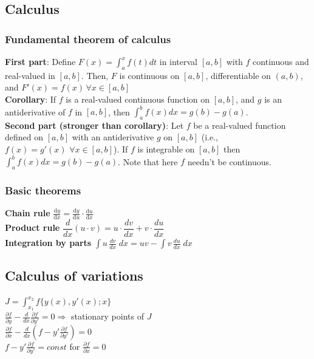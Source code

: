 \documentclass[letterpaper,landscape,10pt]{article}
\begin{document}
{\begin{multicols}{4}
	\subsection*{Calculus}
	\subsubsection*{Fundamental theorem of calculus}
		\textbf{First part}: Define $F(x) = \int_a^x f(t) dt$ in interval
		$[a,b]$ with $f$ continuous and real-valued in $[a,b]$.  Then, $F$ is
		continuous on $[a,b]$, differentiable on $(a,b)$, and $F'(x) = f(x) \,
		\forall x \in [a,b]$\\
		\vspace{4pt}
		\textbf{Corollary}: If $f$ is a real-valued continuous function on
		$[a,b]$, and $g$ is an antiderivative of $f$ in $[a,b]$, then $\int_a^b
		f(x)dx = g(b)-g(a)$.\\
		\vspace{4pt}
		\textbf{Second part (stronger than corollary)}: Let $f$ be a real-valued
		function defined on $[a,b]$ with an antiderivative $g$ on $[a,b]$
		(i.e., $f(x)=g'(x) \,\, \forall x \in [a,b]$).  If $f$ is integrable on
		$[a,b]$ then $\int_a^bf(x)dx = g(b)-g(a)$.  Note that here $f$ needn't
		be continuous.

		\subsubsection*{Basic theorems}
			\textbf{Chain rule} $\frac{\mathrm dy}{\mathrm dx}=\frac{\mathrm dy}{\mathrm du}\cdot\frac
				{\mathrm du}{\mathrm dx}$ \\
			\textbf{Product rule} $\dfrac{d}{dx}(u\cdot v)=u\cdot \dfrac{dv}{dx}+v\cdot \dfrac{du}{dx}$ \\
			\textbf{Integration by parts} $\int u\, \frac{dv}{dx}\; dx=uv-\int v\, \frac{du}{dx} \; dx$

	\subsection*{Calculus of variations}
		$J = \int_{x_1}^{x_2} f\{y(x), y\prime (x); x\}$\\
		$\frac{\partial f}{\partial y}-\frac{d}{dx}\frac{\partial f}{\partial y\prime} = 0 \Rightarrow$ stationary points of $J$\\
		$\frac{\partial f}{\partial x}-\frac{d}{dx}\left(f-y\prime
		\frac{\partial f}{\partial y\prime}\right) = 0$\\
		$f-y\prime \frac{\partial f}{\partial y\prime} =
			const$ for $\frac{\partial f}{\partial x} = 0$


\end{multicols}}
\end{document}
